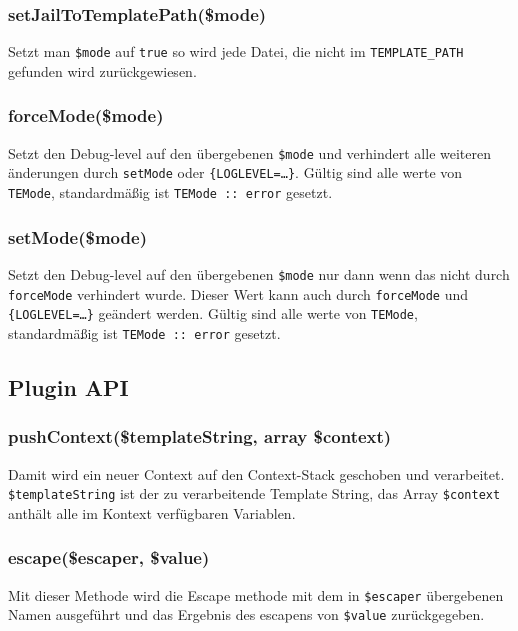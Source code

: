 \documentclass[a4paper,10pt]{article}
\begin{document}
\subsubsection{setJailToTemplatePath(\$mode)}
Setzt man {\tt \$mode} auf {\tt true} so wird jede Datei, die nicht im {\tt TEMPLATE\_PATH}
 gefunden wird zur\"uckgewiesen.

\subsubsection{forceMode(\$mode)}
Setzt den Debug-level auf den \"ubergebenen {\tt \$mode} und verhindert alle weiteren
 \"anderungen durch {\tt setMode} oder {\tt \{LOGLEVEL=\dots\}}. G\"ultig sind alle werte
von {\tt TEMode}, standardm\"a\ss{}ig ist {\tt TEMode :: error} gesetzt.

\subsubsection{setMode(\$mode)}
Setzt den Debug-level auf den \"ubergebenen {\tt \$mode} nur dann wenn das nicht
 durch {\tt forceMode} verhindert wurde. Dieser Wert kann auch durch {\tt forceMode} und
 {\tt \{LOGLEVEL=\dots\}} ge\"andert werden.
G\"ultig sind alle werte von {\tt TEMode}, standardm\"a\ss{}ig ist {\tt TEMode :: error} gesetzt.


\subsection{Plugin API}

\subsubsection{pushContext(\$templateString, array \$context)}
Damit wird ein neuer Context auf den Context-Stack geschoben und verarbeitet.
{\tt \$templateString} ist der zu verarbeitende Template String, das Array {\tt \$context} anth\"alt alle im Kontext verf\"ugbaren Variablen.

\subsubsection{escape(\$escaper, \$value)}
Mit dieser Methode wird die Escape methode mit dem in {\tt \$escaper} \"ubergebenen Namen ausgef\"uhrt und das Ergebnis des escapens von {\tt \$value} zur\"uckgegeben.
\end{document}
